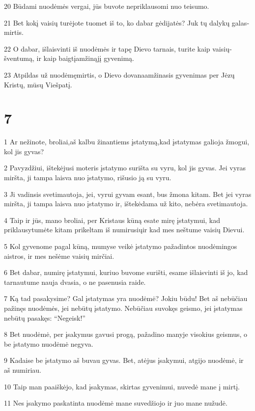 \par 20 Būdami nuodėmės vergai, jūs buvote nepriklausomi nuo teisumo. 
\par 21 Bet kokį vaisių turėjote tuomet iš to, ko dabar gėdijatės? Juk tų dalykų galas­mirtis. 
\par 22 O dabar, išlaisvinti iš nuodėmės ir tapę Dievo tarnais, turite kaip vaisių­šventumą, ir kaip baigtį­amžinąjį gyvenimą. 
\par 23 Atpildas už nuodėmę­mirtis, o Dievo dovana­amžinasis gyvenimas per Jėzų Kristų, mūsų Viešpatį.


\chapter{7}


\par 1 Ar nežinote, broliai,­aš kalbu žinantiems įstatymą,­kad įstatymas galioja žmogui, kol jis gyvas? 
\par 2 Pavyzdžiui, ištekėjusi moteris įstatymo surišta su vyru, kol jis gyvas. Jei vyras miršta, ji tampa laisva nuo įstatymo, rišusio ją su vyru. 
\par 3 Ji vadinsis svetimautoja, jei, vyrui gyvam esant, bus žmona kitam. Bet jei vyras miršta, ji tampa laisva nuo įstatymo ir, ištekėdama už kito, nebėra svetimautoja. 
\par 4 Taip ir jūs, mano broliai, per Kristaus kūną esate mirę įstatymui, kad priklausytumėte kitam­ prikeltam iš numirusių­ir kad mes neštume vaisių Dievui. 
\par 5 Kol gyvenome pagal kūną, mumyse veikė įstatymo pažadintos nuodėmingos aistros, ir mes nešėme vaisių mirčiai. 
\par 6 Bet dabar, numirę įstatymui, kuriuo buvome surišti, esame išlaisvinti iš jo, kad tarnautume nauja dvasia, o ne pasenusia raide. 
\par 7 Ką tad pasakysime? Gal įstatymas yra nuodėmė? Jokiu būdu! Bet aš nebūčiau pažinęs nuodėmės, jei nebūtų įstatymo. Nebūčiau suvokęs geismo, jei įstatymas nebūtų pasakęs: “Negeisk!” 
\par 8 Bet nuodėmė, per įsakymus gavusi progą, pažadino manyje visokius geismus, o be įstatymo nuodėmė negyva. 
\par 9 Kadaise be įstatymo aš buvau gyvas. Bet, atėjus įsakymui, atgijo nuodėmė, ir aš numiriau. 
\par 10 Taip man paaiškėjo, kad įsakymas, skirtas gyvenimui, nuvedė mane į mirtį. 
\par 11 Nes įsakymo paskatinta nuodėmė mane suvedžiojo ir juo mane nužudė. 
